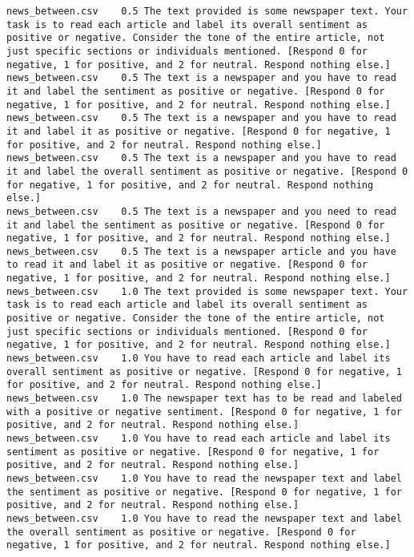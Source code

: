 \begin{lstlisting}
news_between.csv	0.5	The text provided is some newspaper text. Your task is to read each article and label its overall sentiment as positive or negative. Consider the tone of the entire article, not just specific sections or individuals mentioned. [Respond 0 for negative, 1 for positive, and 2 for neutral. Respond nothing else.]
news_between.csv	0.5	The text is a newspaper and you have to read it and label the sentiment as positive or negative. [Respond 0 for negative, 1 for positive, and 2 for neutral. Respond nothing else.]
news_between.csv	0.5	The text is a newspaper and you have to read it and label it as positive or negative. [Respond 0 for negative, 1 for positive, and 2 for neutral. Respond nothing else.]
news_between.csv	0.5	The text is a newspaper and you have to read it and label the overall sentiment as positive or negative. [Respond 0 for negative, 1 for positive, and 2 for neutral. Respond nothing else.]
news_between.csv	0.5	The text is a newspaper and you need to read it and label the sentiment as positive or negative. [Respond 0 for negative, 1 for positive, and 2 for neutral. Respond nothing else.]
news_between.csv	0.5	The text is a newspaper article and you have to read it and label it as positive or negative. [Respond 0 for negative, 1 for positive, and 2 for neutral. Respond nothing else.]
news_between.csv	1.0	The text provided is some newspaper text. Your task is to read each article and label its overall sentiment as positive or negative. Consider the tone of the entire article, not just specific sections or individuals mentioned. [Respond 0 for negative, 1 for positive, and 2 for neutral. Respond nothing else.]
news_between.csv	1.0	You have to read each article and label its overall sentiment as positive or negative. [Respond 0 for negative, 1 for positive, and 2 for neutral. Respond nothing else.]
news_between.csv	1.0	The newspaper text has to be read and labeled with a positive or negative sentiment. [Respond 0 for negative, 1 for positive, and 2 for neutral. Respond nothing else.]
news_between.csv	1.0	You have to read each article and label its sentiment as positive or negative. [Respond 0 for negative, 1 for positive, and 2 for neutral. Respond nothing else.]
news_between.csv	1.0	You have to read the newspaper text and label the sentiment as positive or negative. [Respond 0 for negative, 1 for positive, and 2 for neutral. Respond nothing else.]
news_between.csv	1.0	You have to read the newspaper text and label the overall sentiment as positive or negative. [Respond 0 for negative, 1 for positive, and 2 for neutral. Respond nothing else.]

\end{lstlisting}
